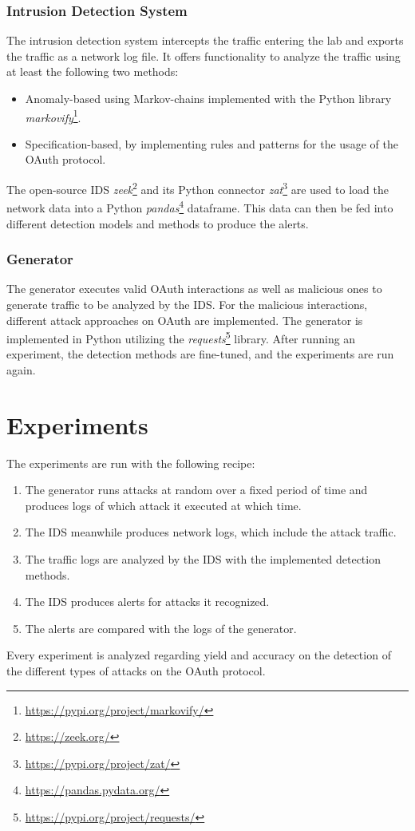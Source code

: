 \documentclass{article}
\begin{document}
\subsubsection{Intrusion Detection System}
The intrusion detection system intercepts the traffic entering the lab and exports the traffic as a network log file. It offers functionality to analyze the traffic using at least the following two methods:

\begin{itemize}
    \item Anomaly-based using Markov-chains implemented with the Python library \emph{markovify}\footnote{\url{https://pypi.org/project/markovify/}}.
    \item Specification-based, by implementing rules and patterns for the usage of the OAuth protocol.
\end{itemize}
The open-source IDS \emph{zeek}\footnote{\url{https://zeek.org/}} and its Python connector \emph{zat}\footnote{\url{https://pypi.org/project/zat/}} are used to load the network data into a Python \emph{pandas}\footnote{\url{https://pandas.pydata.org/}} dataframe. This data can then be fed into different detection models and methods to produce the alerts.

\subsubsection{Generator}
The generator executes valid OAuth interactions as well as malicious ones to generate traffic to be analyzed by the IDS. For the malicious interactions, different attack approaches on OAuth are implemented. The generator is implemented in Python utilizing the \emph{requests}\footnote{\url{https://pypi.org/project/requests/}} library. After running an experiment, the detection methods are fine-tuned, and the experiments are run again.

\section{Experiments}
The experiments are run with the following recipe:
\begin{enumerate}
    \item The generator runs attacks at random over a fixed period of time and produces logs of which attack it executed at which time.
    \item The IDS meanwhile produces network logs, which include the attack traffic.
    \item The traffic logs are analyzed by the IDS with the implemented detection methods.
    \item The IDS produces alerts for attacks it recognized.
    \item The alerts are compared with the logs of the generator.
\end{enumerate}
Every experiment is analyzed regarding yield and accuracy on the detection of the different types of attacks on the OAuth protocol.
\end{document}
